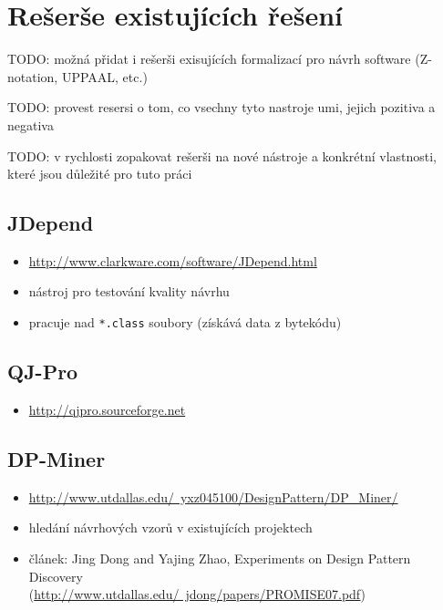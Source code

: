 \section{Rešerše existujících řešení}
\label{requirements-existing_tools}

TODO: možná přidat i rešerši exisujících formalizací pro návrh software (Z-notation, UPPAAL, etc.)

TODO: provest resersi o tom, co vsechny tyto nastroje umi, jejich pozitiva a negativa

TODO: v rychlosti zopakovat rešerši na nové nástroje a konkrétní vlastnosti, které jsou důležité pro tuto práci

\subsection{JDepend}

\begin{itemize}
\item \href{http://www.clarkware.com/software/JDepend.html}{http://www.clarkware.com/software/JDepend.html}
\item nástroj pro testování kvality návrhu
\item pracuje nad \verb+*.class+ soubory (získává data z bytekódu)
\end{itemize}

\subsection{QJ-Pro}
\begin{itemize}
\item \href{http://qjpro.sourceforge.net}{http://qjpro.sourceforge.net}
\end{itemize}

\subsection{DP-Miner}
\begin{itemize}
\item \href{http://www.utdallas.edu/~yxz045100/DesignPattern/DP\_Miner/}{http://www.utdallas.edu/~yxz045100/DesignPattern/DP\_Miner/}
\item hledání návrhových vzorů v existujících projektech
\item článek: Jing Dong and Yajing Zhao, Experiments on Design Pattern Discovery \\ (\href{http://www.utdallas.edu/~jdong/papers/PROMISE07.pdf}{http://www.utdallas.edu/~jdong/papers/PROMISE07.pdf})
\end{itemize}

